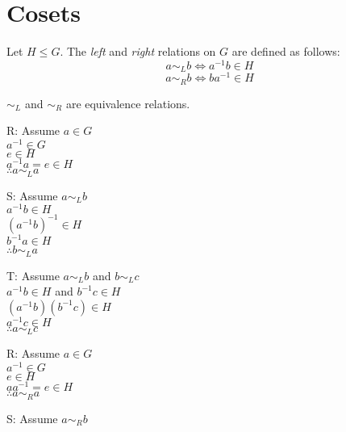 \documentclass[letterpaper,12pt,fleqn]{article}
\renewcommand{\l}{\sim_L}
\renewcommand{\r}{\sim_R}
\begin{document}
\section*{Cosets}

\begin{definition}
  Let $H\le G$. The \emph{left} and \emph{right} relations on $G$ are defined
  as follows:
  \[a\l b\iff a^{-1}b\in H\]
  \[a\r b\iff ba^{-1}\in H\]
\end{definition}

\begin{theorem}
  $\l$ and $\r$ are equivalence relations.
\end{theorem}

\begin{theproof}
  \begin{minipage}{3in}
    \begin{description}
    \item{R}: Assume $a\in G$ \\
      $a^{-1}\in G$ \\
      $e\in H$ \\
      $a^{-1}a=e\in H$ \\
      $\therefore a\l a$
    \item{S}: Assume $a\l b$ \\
      $a^{-1}b\in H$ \\
      $(a^{-1}b)^{-1}\in H$ \\
      $b^{-1}a\in H$ \\
      $\therefore b\l a$
    \item{T}: Assume $a\l b$ and $b\l c$ \\
      $a^{-1}b\in H$ and $b^{-1}c\in H$ \\
      $(a^{-1}b)(b^{-1}c)\in H$ \\
      $a^{-1}c\in H$ \\
      $\therefore a\l c$
    \end{description}
  \end{minipage}
  \begin{minipage}{3in}
    \begin{description}
    \item{R}: Assume $a\in G$ \\
      $a^{-1}\in G$ \\
      $e\in H$ \\
      $aa^{-1}=e\in H$ \\
      $\therefore a\r a$
    \item{S}: Assume $a\r b$ \\

\end{description}
\end{minipage}
\end{theproof}
\end{document}
